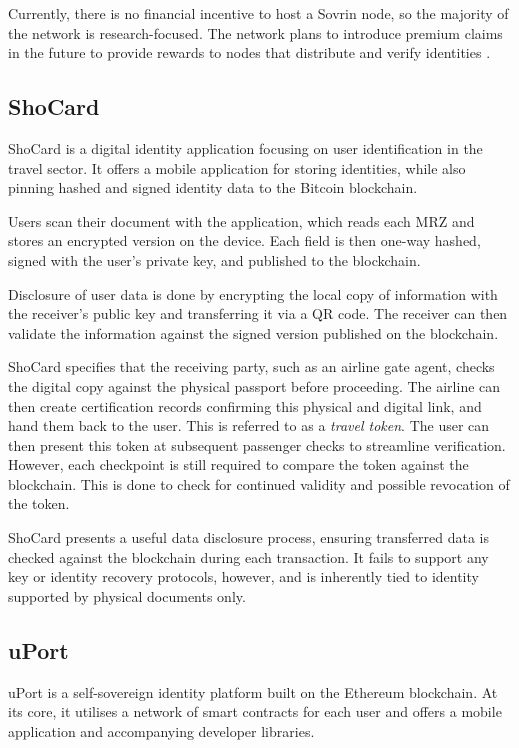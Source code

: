 Currently, there is no financial incentive to host a Sovrin node, so the majority of the network is research-focused. The network plans to introduce premium claims in the future to provide rewards to nodes that distribute and verify identities \cite{sovrin_foundation_sovrin_nodate}. 

\subsection{ShoCard}
ShoCard \cite{shocard_inc._shocard:_2016} is a digital identity application focusing on user identification in the travel sector. It offers a mobile application for storing identities, while also pinning hashed and signed identity data to the Bitcoin blockchain.

Users scan their document with the application, which reads each \ac{MRZ} and stores an encrypted version on the device. Each field is then one-way hashed, signed with the user's private key, and published to the blockchain.

Disclosure of user data is done by encrypting the local copy of information with the receiver's public key and transferring it via a QR code. The receiver can then validate the information against the signed version published on the blockchain. 

ShoCard specifies that the receiving party, such as an airline gate agent, checks the digital copy against the physical passport before proceeding. The airline can then create certification records confirming this physical and digital link, and hand them back to the user. This is referred to as a \textit{travel token}. The user can then present this token at subsequent passenger checks to streamline verification. However, each checkpoint is still required to compare the token against the blockchain. This is done to check for continued validity and possible revocation of the token.

ShoCard presents a useful data disclosure process, ensuring transferred data is checked against the blockchain during each transaction. It fails to support any key or identity recovery protocols, however, and is inherently tied to identity supported by physical documents only.

\subsection{uPort}
\label{sec:uport}
uPort is a self-sovereign identity platform built on the Ethereum blockchain. At its core, it utilises a network of smart contracts for each user and offers a mobile application and accompanying developer libraries.

